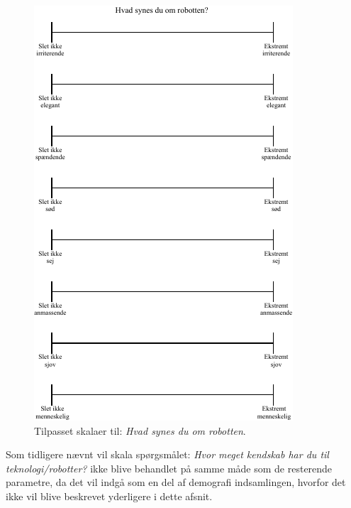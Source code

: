 \begin{figure}[H]
\centering
\includegraphics[width =\textwidth]{Figure/TilpasningAfSkalaer/HvadSynesDuOmR} 
\caption{Tilpasset skalaer til: \textit{Hvad synes du om robotten}.}
\label{fig:TilpasningHvadSynesDuOmR}
\end{figure}
\noindent
%
Som tidligere nævnt vil skala spørgsmålet: \textit{Hvor meget kendskab har du til teknologi/robotter?} ikke blive behandlet på samme måde som de resterende parametre, da det vil indgå som en del af demografi indsamlingen, hvorfor det ikke vil blive beskrevet yderligere i dette afsnit. 



